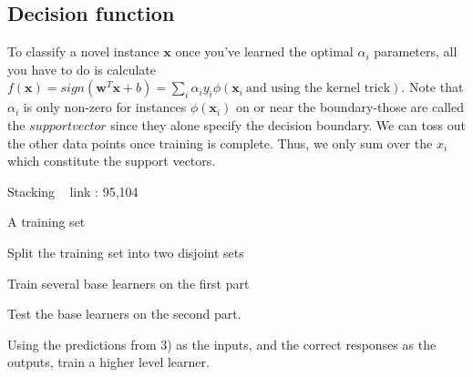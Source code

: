 \documentclass[a4paper]{article}
\begin{document}
\begin{algorithm}
\begin{algorithmic}
      
      \section{Decision function}
To classify a novel instance $\textbf{x}$ once you've learned the optimal $\alpha_{i}$ parameters, all you have to do is calculate $f(\textbf{x}) = sign(\textbf{w}^T\textbf{x}+b) = \sum_{i}\alpha_{i}y_{i}\phi(\textbf{x}_{i}\  \text{and using the kernel trick})$. Note that $\alpha_{i}$ is only non-zero for instances $\phi(\textbf{x}_{i})$ on or near the boundary-those are called the $support vector $ since they alone specify the decision boundary. We can toss out the other data points once training is complete. Thus, we only sum over the $x_{i}$ which constitute the support vectors.
  \end{algorithmic}
\end{algorithm} 


 \begin{algorithm}
   \caption{Stacking ~\cite{Wolpert92stackedgeneralization
   } link : 95,104}
   
   
   
  \begin{algorithmic}[1]
   \INPUT 
   \Statex A training set 
   
  
  \State Split the training set into two disjoint sets
  
  \State Train several base learners on the first part
  
  \State Test the base learners on the second part.
  
  \State Using the predictions from 3) as the inputs, and the correct responses as the outputs, train a higher level learner.
    
   
    \end{algorithmic}
\end{algorithm} 
      
\end{document}
